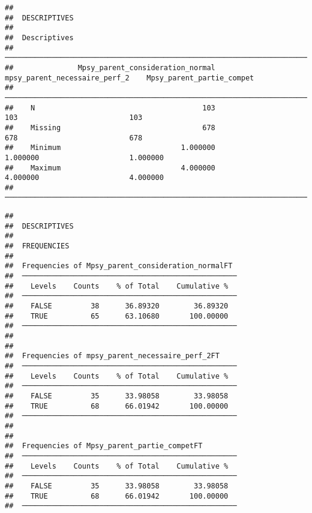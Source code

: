\documentclass[
]{article}
\begin{document}
\begin{verbatim}
## 
##  DESCRIPTIVES
## 
##  Descriptives                                                                                                  
##  ───────────────────────────────────────────────────────────────────────────────────────────────────────────── 
##               Mpsy_parent_consideration_normal    mpsy_parent_necessaire_perf_2    Mpsy_parent_partie_compet   
##  ───────────────────────────────────────────────────────────────────────────────────────────────────────────── 
##    N                                       103                              103                          103   
##    Missing                                 678                              678                          678   
##    Minimum                            1.000000                         1.000000                     1.000000   
##    Maximum                            4.000000                         4.000000                     4.000000   
##  ─────────────────────────────────────────────────────────────────────────────────────────────────────────────
\end{verbatim}

\begin{verbatim}
## 
##  DESCRIPTIVES
## 
##  FREQUENCIES
## 
##  Frequencies of Mpsy_parent_consideration_normalFT  
##  ────────────────────────────────────────────────── 
##    Levels    Counts    % of Total    Cumulative %   
##  ────────────────────────────────────────────────── 
##    FALSE         38      36.89320        36.89320   
##    TRUE          65      63.10680       100.00000   
##  ────────────────────────────────────────────────── 
## 
## 
##  Frequencies of mpsy_parent_necessaire_perf_2FT     
##  ────────────────────────────────────────────────── 
##    Levels    Counts    % of Total    Cumulative %   
##  ────────────────────────────────────────────────── 
##    FALSE         35      33.98058        33.98058   
##    TRUE          68      66.01942       100.00000   
##  ────────────────────────────────────────────────── 
## 
## 
##  Frequencies of Mpsy_parent_partie_competFT         
##  ────────────────────────────────────────────────── 
##    Levels    Counts    % of Total    Cumulative %   
##  ────────────────────────────────────────────────── 
##    FALSE         35      33.98058        33.98058   
##    TRUE          68      66.01942       100.00000   
##  ──────────────────────────────────────────────────
\end{verbatim}
\end{document}
